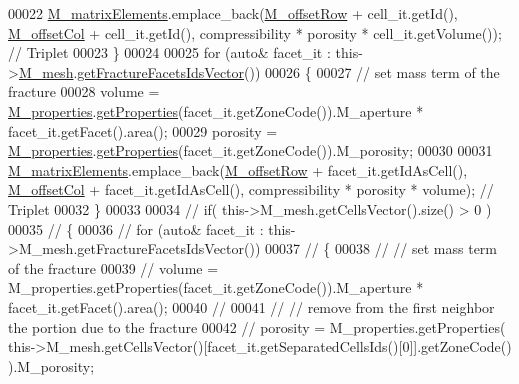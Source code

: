 \begin{DoxyCode}
00022         \hyperlink{classFVCode3D_1_1MatrixHandler_a0bbdfb8d779ca20d8ba69b99cac1f4d6}{M\_matrixElements}.emplace\_back(\hyperlink{classFVCode3D_1_1MatrixHandler_ad3faa8b15bca6e0052be8c868b924444}{M\_offsetRow} + cell\_it.getId(), 
      \hyperlink{classFVCode3D_1_1MatrixHandler_a6ec7cf5178c1c25b54abc46ff0affcf2}{M\_offsetCol} + cell\_it.getId(), compressibility * porosity * cell\_it.getVolume()); \textcolor{comment}{// Triplet}
00023     \}
00024 
00025     \textcolor{keywordflow}{for} (\textcolor{keyword}{auto}& facet\_it : this->\hyperlink{classFVCode3D_1_1MatrixHandler_a72f185cb557fc2e8023bd09a074f685c}{M\_mesh}.\hyperlink{classFVCode3D_1_1Rigid__Mesh_aadbe6d9ad704122537903396d91238e0}{getFractureFacetsIdsVector}())
00026     \{
00027         \textcolor{comment}{// set mass term of the fracture}
00028         volume = \hyperlink{classFVCode3D_1_1MatrixHandler_ad17a7941b1b8272f50fc6e1c660103fa}{M\_properties}.\hyperlink{classFVCode3D_1_1PropertiesMap_ace888d15c9a4ab13d5e217a3a565604c}{getProperties}(facet\_it.getZoneCode()).M\_aperture * 
      facet\_it.getFacet().area();
00029         porosity = \hyperlink{classFVCode3D_1_1MatrixHandler_ad17a7941b1b8272f50fc6e1c660103fa}{M\_properties}.\hyperlink{classFVCode3D_1_1PropertiesMap_ace888d15c9a4ab13d5e217a3a565604c}{getProperties}(facet\_it.getZoneCode()).M\_porosity;
00030 
00031         \hyperlink{classFVCode3D_1_1MatrixHandler_a0bbdfb8d779ca20d8ba69b99cac1f4d6}{M\_matrixElements}.emplace\_back(\hyperlink{classFVCode3D_1_1MatrixHandler_ad3faa8b15bca6e0052be8c868b924444}{M\_offsetRow} + facet\_it.getIdAsCell(), 
      \hyperlink{classFVCode3D_1_1MatrixHandler_a6ec7cf5178c1c25b54abc46ff0affcf2}{M\_offsetCol} + facet\_it.getIdAsCell(), compressibility * porosity * volume); \textcolor{comment}{// Triplet}
00032     \}
00033 
00034 \textcolor{comment}{//    if( this->M\_mesh.getCellsVector().size() > 0 )}
00035 \textcolor{comment}{//    \{}
00036 \textcolor{comment}{//        for (auto& facet\_it : this->M\_mesh.getFractureFacetsIdsVector())}
00037 \textcolor{comment}{//        \{}
00038 \textcolor{comment}{//            // set mass term of the fracture}
00039 \textcolor{comment}{//            volume = M\_properties.getProperties(facet\_it.getZoneCode()).M\_aperture *
       facet\_it.getFacet().area();}
00040 \textcolor{comment}{//}
00041 \textcolor{comment}{//            // remove from the first neighbor the portion due to the fracture}
00042 \textcolor{comment}{//            porosity = M\_properties.getProperties(
       this->M\_mesh.getCellsVector()[facet\_it.getSeparatedCellsIds()[0]].getZoneCode() ).M\_porosity;}

\end{DoxyCode}
